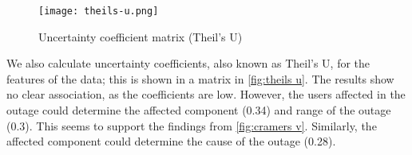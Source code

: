 \begin{figure}[h]
  \centering
  \texttt{[image: theils-u.png]}
  \caption{Uncertainty coefficient matrix (Theil's U)}
  \label{fig:theils u}
\end{figure}

We also calculate uncertainty coefficients, also known as Theil's U, for the features of the data; this is shown in a matrix in \autoref{fig:theils u}.
The results show no clear association, as the coefficients are low.
However, the users affected in the outage could determine the affected component (0.34) and range of the outage (0.3).
This seems to support the findings from \autoref{fig:cramers v}.
Similarly, the affected component could determine the cause of the outage (0.28).
